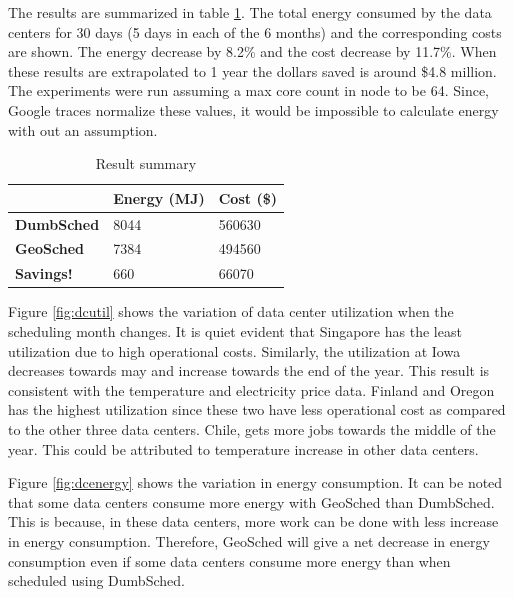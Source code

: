 \documentclass[conference,12pt]{IEEEtran}
\begin{document}
The results are summarized in table \ref{table:summary}. The total energy consumed by the data centers for 30 days (5 days in each of the 6 months) and the corresponding costs are shown. The energy  decrease by 8.2\% and the cost decrease by 11.7\%. When these results are extrapolated to 1 year the dollars  saved is around \$4.8 million. The experiments were run assuming a max core count in node to be 64. Since, Google traces normalize these values, it would be impossible to calculate energy with out an assumption.

\begin{table}[] 

 \centering
\begin{tabular}{|l|l|l|}
\hline
      &       \bf{Energy (MJ)} & \bf{Cost (\$)} \\ \hline
\bf{DumbSched} & 8044  & 560630   \\ \hline
\bf{GeoSched} & 7384 & 494560   \\ \hline
\bf{ Savings! } & 660 & 66070    \\ \hline
\end{tabular}
\caption {Result summary} \label{table:summary}
\end{table}


Figure \ref{fig:dcutil} shows the variation of data center utilization when the scheduling month changes. It is quiet evident that Singapore has the least utilization due to high operational costs. Similarly, the utilization at Iowa decreases towards may and increase towards the end of the year. This result is consistent with the temperature and electricity price data. Finland and Oregon has the highest utilization since these two have less operational cost as compared to the other three data centers. Chile, gets more jobs towards the middle of the year. This could be attributed to temperature increase in other data centers. 





Figure \ref{fig:dcenergy} shows the variation in energy consumption. It can be noted that some data centers consume more energy with GeoSched than DumbSched. This is because, in these data centers, more work can be done with less increase in energy consumption. Therefore, GeoSched will give a net decrease in energy consumption even if some data centers consume more energy than when scheduled using DumbSched.
\end{document}
